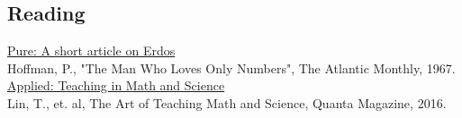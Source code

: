 \documentclass{article}
\begin{document}
\begin{enumerate}
\section{Reading}
\href{https://docs.google.com/viewer?url=https\%3A\%2F\%2Fcs.brynmawr.edu\%2FCourses\%2Fcs231\%2Ffall2013\%2Flecs\%2Ferdos.pdf}{Pure: A short article on Erdos}\\
Hoffman, P., "The Man Who Loves Only Numbers", The Atlantic Monthly, 1967.\\
\href{https://www.quantamagazine.org/math-and-science-teachers-pencils-down-20161011/}{Applied: Teaching in Math and Science}\\
Lin, T., et. al, The Art of Teaching Math and Science, Quanta Magazine, 2016.\\


\end{enumerate}
\end{document}
